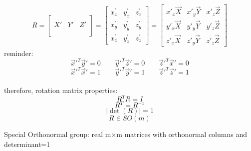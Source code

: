 \documentclass{article}
\begin{document}
\begin{gather}
    R =
        \begin{bmatrix}
        \\
        X{'} & Y{'} & Z{'} \\
        \\
        \end{bmatrix} =
        \begin{bmatrix}
        x_{x}^{'} & y_{x}^{'} & z_{x}^{'}\\
        x_{y}^{'} & y_{y}^{'} & z_{y}^{'}\\
        x_{z}^{'} & y_{z}^{'} & z_{z}^{'}
        \end{bmatrix} =
        \begin{bmatrix}
         x{'}_{x}\vec{X} & x{'}_{y}\vec{Y}  & x{'}_{z}\vec{Z}\\
         y{'}_{x}\vec{X} & y{'}_{y}\vec{Y}  & y{'}_{z}\vec{Z}\\
         z{'}_{x}\vec{X} & z{'}_{y}\vec{Y}  & z{'}_{z}\vec{Z}
    \end{bmatrix}
\end{gather}
reminder:\\
$$ \vec{x}{'^T}\vec{y}{'} = 0 \qquad \vec{y}{'^T}\vec{z}{'} = 0 \qquad  \vec{z}{'^T}\vec{x}{'} = 0$$
$$ \vec{x}{'^T}\vec{x}{'} = 1 \qquad \vec{y}{'^T}\vec{y}{'} = 1 \qquad  \vec{z}{'^T}\vec{z}{'} = 1$$
\\
therefore, rotation matrix properties:
$$ R{^T}R=I$$
$$ R{^T}=R{^{-1}}$$
$$ |\det({R})|=1 $$
$$ R\in SO(m) $$

Special Orthonormal group: real m×m matrices with orthonormal columns and
determinant=1

 \newpage
\end{document}
